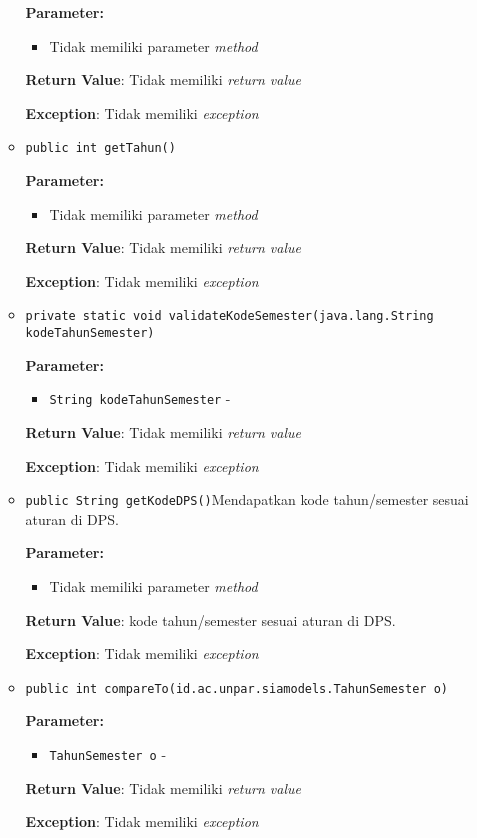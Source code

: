 \documentclass{article}
\begin{document}
\begin{enumerate}
\begin{itemize}
\textbf{Parameter:}
\begin{itemize}
\item Tidak memiliki parameter \textit{method}
\end{itemize}
\textbf{Return Value}: Tidak memiliki \textit{return value}

\textbf{Exception}: Tidak memiliki \textit{exception}

\item \texttt{public int getTahun()}

\textbf{Parameter:}
\begin{itemize}
\item Tidak memiliki parameter \textit{method}
\end{itemize}
\textbf{Return Value}: Tidak memiliki \textit{return value}

\textbf{Exception}: Tidak memiliki \textit{exception}

\item \texttt{private static void validateKodeSemester(java.lang.String kodeTahunSemester)}

\textbf{Parameter:}
\begin{itemize}
\item \texttt{String kodeTahunSemester} - 
\end{itemize}
\textbf{Return Value}: Tidak memiliki \textit{return value}

\textbf{Exception}: Tidak memiliki \textit{exception}

\item \texttt{public String getKodeDPS()}Mendapatkan kode tahun/semester sesuai aturan di DPS.

\textbf{Parameter:}
\begin{itemize}
\item Tidak memiliki parameter \textit{method}
\end{itemize}
\textbf{Return Value}: kode tahun/semester sesuai aturan di DPS.

\textbf{Exception}: Tidak memiliki \textit{exception}

\item \texttt{public int compareTo(id.ac.unpar.siamodels.TahunSemester o)}

\textbf{Parameter:}
\begin{itemize}
\item \texttt{TahunSemester o} - 
\end{itemize}
\textbf{Return Value}: Tidak memiliki \textit{return value}

\textbf{Exception}: Tidak memiliki \textit{exception}


\end{itemize}
\end{enumerate}
\end{document}
